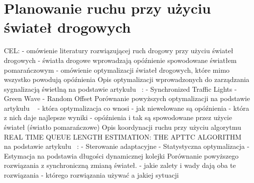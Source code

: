 \section{Planowanie ruchu przy użyciu świateł drogowych}

CEL:
\newline
- omówienie literatury rozwiązującej ruch drogowy przy użyciu świateł drogowych
\newline
- światła drogowe wprowadzają opóźnienie spowodowane światłem pomarańczowym
\newline
- omówienie optymalizacji świateł drogowych, które mimo wszystko powodują opóźnienia
\newline
\newline
Opis optymalizacji wprowadzonych do zarządzania sygnalizacją świetlną na podstawie artykułu ~\cite{brockfeld2001optimizing}:
  \newline
  - Synchronized Traffic Lights
  \newline
  - Green Wave
  \newline
  - Random Offset
\newline
\newline
Porównanie powyższych optymalizacji na podstawie artykułu ~\cite{brockfeld2001optimizing}
\newline
- która optymalizacja co wnosi
\newline
- jak niewelowane są opóźnienia
\newline
- która z nich daje najlepsze wyniki
\newline
- opóźnienia i tak są spowodowane przez użycie świateł (światło pomarańczowe)
\newline
\newline
Opis koordynacji ruchu przy użyciu algorytmu REAL TIME QUEUE LENGTH ESTIMATION: THE APTTC ALGORITHM na podstawie artykułu ~\cite{athmaraman2005adaptive}:
  \newline
  - Sterowanie adaptacyjne
  \newline
  - Statystyczna optymalizacja
  \newline
  - Estymacja na podstawia długości dynamicznej kolejki
  \newline
\newline
Porównanie powyższego rozwiązania z synchroniczną zmianą świateł.
\newline
- jakie zalety i wady dają oba te rozwiązania
\newline
- którego rozwiązania używać a jakiej sytuacji
\newline
\newline
